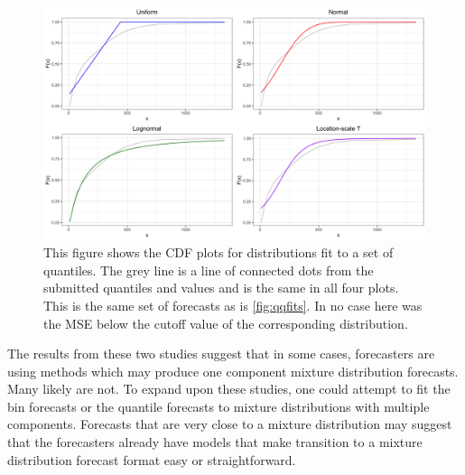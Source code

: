 \documentclass[11pt,notitlepage]{isuthesis}
\begin{document}
\begin{figure}[htbp]
\centerline{\includegraphics[scale=.15]{Images/cdf_gleam_110121_1wkincdeath_st16.png}}
\begin{center}
\begin{minipage}{10cm}
\captionsetup{font=scriptsize}
\caption[CDF plot for quantile fit]{This figure shows the CDF plots for 
distributions fit to a set of quantiles. The grey line is a line of connected 
dots from the submitted quantiles and values and is the same in all four plots.
This is the same set of forecasts as is \ref{fig:qqfits}.
In no case here was the MSE below the cutoff value of the 
corresponding distribution.}
\label{fig:cdffits}
\end{minipage}
\end{center}
\end{figure}



The results from these two studies suggest that in some cases, forecasters
are using methods which may produce one component mixture distribution
forecasts. Many
likely are not. To expand upon these studies, one could attempt to fit the 
bin forecasts or the quantile forecasts to mixture 
distributions with multiple components. Forecasts that are very close to 
a mixture distribution may suggest that the forecasters already have models that
make transition to a mixture distribution forecast format easy or
straightforward.
\end{document}
